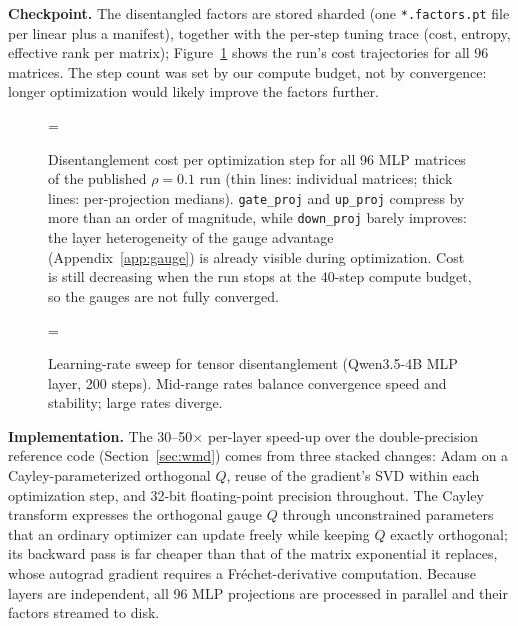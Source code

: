 \documentclass[9pt]{article}
\newcommand{\inputpgf}[1]{%
  \begingroup
  \def\mathdefault##1{##1}%
  \everymath=\expandafter{\the\everymath\displaystyle}%
  \fontsize{8}{9.6}\selectfont
  \endgroup
}
\begin{document}
\textbf{Checkpoint.} The disentangled factors are stored sharded (one
\texttt{*.factors.pt} file per linear plus a manifest), together with the
per-step tuning trace (cost, entropy, effective rank per matrix);
Figure~\ref{fig:tuning} shows the run's cost trajectories for all 96
matrices. The step count was set by our compute budget, not by convergence:
longer optimization would likely improve the factors further.

\begin{figure}[p]
  \centering
  \inputpgf{figures/disentanglement_loss.pgf}
  \caption{Disentanglement cost per optimization step for all 96 MLP
    matrices of the published $\rho{=}0.1$ run (thin lines: individual
    matrices; thick lines: per-projection medians). \texttt{gate\_proj} and
    \texttt{up\_proj} compress by more than an order of magnitude, while
    \texttt{down\_proj} barely improves: the layer heterogeneity of the
    gauge advantage (Appendix~\ref{app:gauge}) is already visible during
    optimization. Cost is still decreasing when the run stops at the
    40-step compute budget, so the gauges are not fully converged.}
  \label{fig:tuning}
\end{figure}

\begin{figure}[p]
  \centering
  \inputpgf{figures/lr_sweep.pgf}
  \caption{Learning-rate sweep for tensor disentanglement (Qwen3.5-4B MLP
    layer, 200 steps). Mid-range rates balance convergence speed and
    stability; large rates diverge.}
  \label{fig:lr}
\end{figure}

\textbf{Implementation.} The 30--50$\times$ per-layer speed-up over the
double-precision reference code (Section~\ref{sec:wmd}) comes from three
stacked changes: Adam on a Cayley-parameterized orthogonal $Q$, reuse of the
gradient's SVD within each optimization step, and 32-bit floating-point
precision throughout. The Cayley transform expresses the orthogonal gauge
$Q$ through unconstrained parameters that an ordinary optimizer can update
freely while keeping $Q$ exactly orthogonal; its backward pass is far cheaper
than that of the matrix exponential it replaces, whose autograd gradient
requires a Fr\'echet-derivative computation. Because layers are independent,
all 96 MLP projections are processed in parallel and their factors streamed
to disk.
\end{document}
